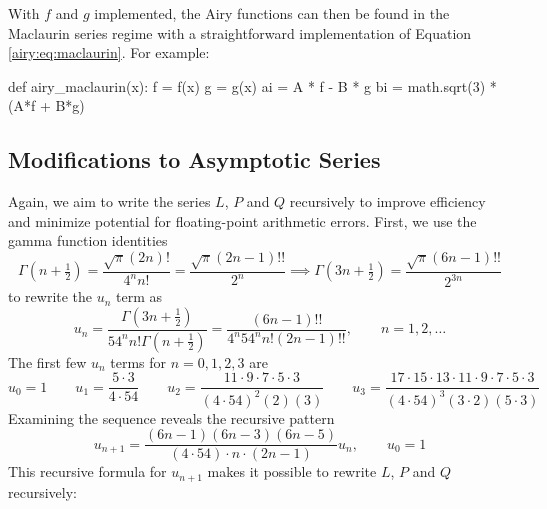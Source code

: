 \documentclass[11pt, a4paper]{article}
\begin{document}
With $ f $ and $ g $ implemented, the Airy functions can then be found in the Maclaurin series regime with a straightforward implementation of Equation \ref{airy:eq:maclaurin}. For example:
\begin{myminted}
def airy_maclaurin(x):
    f = f(x)
    g = g(x)
    ai = A * f - B * g
    bi = math.sqrt(3) * (A*f + B*g)
\end{myminted}

\subsection{Modifications to Asymptotic Series}
Again, we aim to write the series $ L $, $ P $ and $ Q $ recursively to improve efficiency and minimize potential for floating-point arithmetic errors. First, we use the gamma function identities
\begin{equation*}
	\Gamma\left(n + \tfrac{1}{2}\right) = \frac{\sqrt{\pi}(2n)!}{4^{n}n!} = \frac{\sqrt{\pi}(2n-1)!!}{2^{n}} \implies \Gamma\left(3n + \tfrac{1}{2}\right) = \frac{\sqrt{\pi}(6n-1)!!}{2^{3n}}
\end{equation*}
to rewrite the $ u_{n} $ term as
\begin{equation*}
	u_{n} = \frac{\Gamma\left(3n+\tfrac{1}{2}\right)}{54^{n}n!\Gamma\left(n + \tfrac{1}{2}\right)} = \frac{(6n-1)!!}{4^{n}54^{n}n!(2n-1)!!}, \qquad n = 1, 2, \ldots
\end{equation*}
The first few $ u_{n} $ terms for $ n = 0, 1, 2, 3 $ are
\begin{equation*}
	u_{0} = 1 \qquad u_{1} = \frac{5\cdot 3}{4 \cdot 54} \qquad u_{2} = \frac{11 \cdot 9 \cdot 7 \cdot 5 \cdot 3}{(4\cdot54)^{2}(2)(3)} \qquad u_{3} = \frac{17 \cdot 15 \cdot 13 \cdot 11 \cdot 9 \cdot 7 \cdot 5 \cdot 3}{(4 \cdot 54)^{3}(3\cdot 2)(5 \cdot 3)}
\end{equation*}
Examining the sequence reveals the recursive pattern
\begin{equation*}
	u_{n+1} = \frac{(6n-1)(6n-3)(6n-5)}{(4\cdot54)\cdot n \cdot (2n-1)}u_{n}, \qquad u_{0} = 1
\end{equation*}
This recursive formula for $ u_{n+1} $ makes it possible to rewrite $ L $, $ P $ and $ Q $ recursively:
\end{document}
